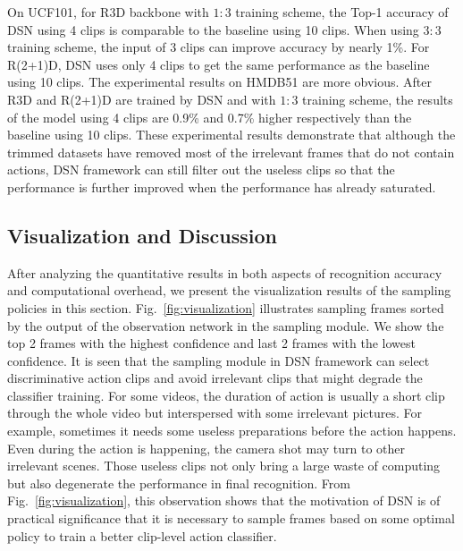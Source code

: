 \documentclass[journal]{IEEEtran}
\begin{document}
On UCF101, for R3D backbone with $1:3$ training scheme, the Top-1 accuracy of DSN using 4 clips is comparable to the baseline using 10 clips.
When using $3:3$ training scheme, the input of 3 clips can improve accuracy by nearly 1\%.
For R(2+1)D, DSN uses only 4 clips to get the same performance as the baseline using 10 clips.
The experimental results on HMDB51 are more obvious.
After R3D and R(2+1)D are trained by DSN and with $1:3$ training scheme, the results of the model using 4 clips are 0.9\% and 0.7\% higher respectively than the baseline using 10 clips. These experimental results demonstrate that although the trimmed datasets have removed most of the irrelevant frames that do not contain actions, DSN framework can still filter out the useless clips so that the performance is further improved when the performance has already saturated.




\subsection{Visualization and Discussion}
After analyzing the quantitative results in both aspects of recognition accuracy and computational overhead, we present the visualization results of the sampling policies in this section.
Fig.~\ref{fig:visualization} illustrates sampling frames sorted by the output of the observation network in the sampling module.
We show the top 2 frames with the highest confidence and last 2 frames with the lowest confidence.
It is seen that the sampling module in DSN framework can select discriminative action clips and avoid irrelevant clips that might degrade the classifier training.
For some videos, the duration of action is usually a short clip through the whole video but interspersed with some irrelevant pictures.
For example, sometimes it needs some useless preparations before the action happens.
Even during the action is happening, the camera shot may turn to other irrelevant scenes.
Those useless clips not only bring a large waste of computing but also degenerate the performance in final recognition.
From Fig.~\ref{fig:visualization}, this observation shows that the motivation of DSN is of practical significance that it is necessary to sample frames based on some optimal policy to train a better clip-level action classifier.
\end{document}
